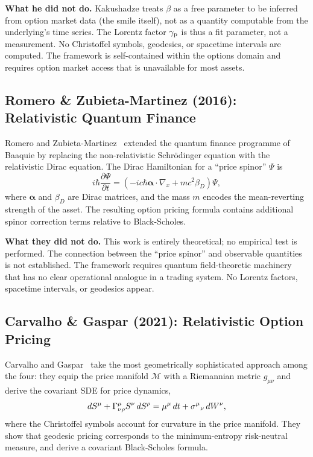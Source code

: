 \textbf{What he did not do.}  Kakushadze treats $\beta$ as a free parameter to
be inferred from option market data (the smile itself), not as a quantity
computable from the underlying's \ohlcv{} time series.  The Lorentz factor
$\gamma_{\mathrm{p}}$ is thus a fit parameter, not a measurement.  No Christoffel symbols,
geodesics, or spacetime intervals are computed.  The framework is self-contained
within the options domain and requires option market access that is unavailable
for most assets.

\subsection{Romero \& Zubieta-Martinez (2016): Relativistic Quantum Finance}

Romero and Zubieta-Martinez~\cite{Romero2016} extended the quantum finance
programme of Baaquie by replacing the non-relativistic Schrödinger equation
with the relativistic Dirac equation.  The Dirac Hamiltonian for a ``price
spinor'' $\Psi$ is
\begin{equation}
  i\hbar \frac{\partial \Psi}{\partial t} = \left(
    -ic\hbar \boldsymbol{\alpha} \cdot \nabla_x + mc^2 \beta_D
  \right) \Psi,
\end{equation}
where $\boldsymbol{\alpha}$ and $\beta_D$ are Dirac matrices, and the mass $m$
encodes the mean-reverting strength of the asset.  The resulting option pricing
formula contains additional spinor correction terms relative to
Black-Scholes.

\textbf{What they did not do.}  This work is entirely theoretical; no
empirical test is performed.  The connection between the ``price spinor'' and
observable \ohlcv{} quantities is not established.  The framework requires
quantum field-theoretic machinery that has no clear operational analogue in a
trading system.  No Lorentz factors, spacetime intervals, or geodesics appear.

\subsection{Carvalho \& Gaspar (2021): Relativistic Option Pricing}

Carvalho and Gaspar~\cite{Carvalho2021} take the most geometrically
sophisticated approach among the four: they equip the price manifold $\mathcal{M}$
with a Riemannian metric $g_{\mu\nu}$ and derive the covariant SDE for price
dynamics,
\begin{equation}
  dS^\mu + \Gamma^{\mu}_{\nu \rho} S^\nu \, dS^\rho
  = \mu^\mu \, dt + \sigma^\mu{}_\nu \, dW^\nu,
  \label{eq:carvalho_sde}
\end{equation}
where the Christoffel symbols account for curvature in the price manifold.
They show that geodesic pricing corresponds to the minimum-entropy risk-neutral
measure, and derive a covariant Black-Scholes formula.

